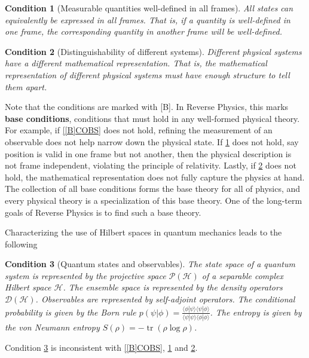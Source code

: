 \documentclass[entropy,article,submit,moreauthors]{Definitions/mdpi}
\newtheorem{condth}{Condition}
\renewcommand*{\thecondth}{\Roman{condth}}
\newenvironment{condition}[2][]{\renewcommand{\thecondth}{#2}\begin{condth}[#1]\label{#2}}{\end{condth}\renewcommand{\thecondth}{\Roman{condth}}}
\def\>{\rangle}
\def\<{\langle}
\DeclareMathOperator{\tr}{tr}
\begin{document}
\begin{condition}[Measurable quantities well-defined in all frames]{[B]WDQ}
 	All states can equivalently be expressed in all frames. That is, if a quantity is well-defined in one frame, the corresponding quantity in another frame will be well-defined.
\end{condition}

\begin{condition}[Distinguishability of different systems]{[B]STDIST}
 	Different physical systems have a different mathematical representation. That is, the mathematical representation of different physical systems must have enough structure to tell them apart.
\end{condition}

Note that the conditions are marked with [B]. In Reverse Physics, this marks \textbf{base conditions}, conditions that must hold in any well-formed physical theory. For example, if \ref{[B]COBS} does not hold, refining the measurement of an observable does not help narrow down the physical state. If \ref{[B]WDQ} does not hold, say position is valid in one frame but not another, then the physical description is not frame independent, violating the principle of relativity. Lastly, if \ref{[B]STDIST} does not hold, the mathematical representation does not fully capture the physics at hand.  The collection of all base conditions forms the base theory for all of physics, and every physical theory is a specialization of this base theory. One of the long-term goals of Reverse Physics is to find such a base theory.

Characterizing the use of Hilbert spaces in quantum mechanics leads to the following
\begin{condition}[Quantum states and observables]{QSTO:H}
	The state space of a quantum system is represented by the projective space $\mathcal{P}(\mathcal{H})$ of a separable complex Hilbert space $\mathcal{H}$. The ensemble space is represented by the density operators $\mathcal{D}(\mathcal{H})$. Observables are represented by self-adjoint operators. The conditional probability is given by the Born rule $p(\psi|\phi) = \frac{\< \phi | \psi \>\< \psi | \phi \>}{\< \psi | \psi \>\< \phi | \phi \>}$. The entropy is given by the von Neumann entropy $S(\rho) = -\tr(\rho \log \rho)$.
\end{condition}
\begin{Theorem}
	Condition \ref{QSTO:H} is inconsistent with \ref{[B]COBS}, \ref{[B]WDQ} and \ref{[B]STDIST}.
\end{Theorem}
\end{document}

